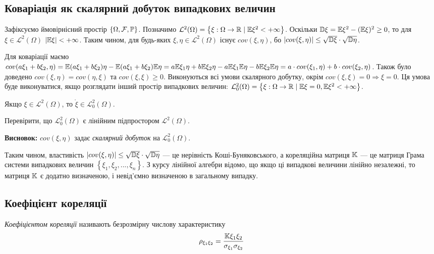 \subsection{Коваріація як скалярний добуток випадкових величин}
Зафіксуємо ймовірнісний простір $\left\{\Omega, \mathcal{F}, \P\right\}$.
Позначимо $\mathcal{L}^2(\Omega) = \left\{\xi : \Omega \rightarrow \mathbb{R} \;|\; \E\xi^2 < +\infty\right\}$.
Оскільки $\D\xi = \E\xi^2 - (\E\xi)^2 \geq 0$, то для $\xi \in \mathcal{L}^2(\Omega)$ $|\E\xi| < +\infty$.
Таким чином, для будь-яких $\xi, \eta \in \mathcal{L}^2(\Omega)$ 
існує ${cov}(\xi,\eta)$, бо $|{cov}(\xi,\eta)| \leq \sqrt{\D\xi} \cdot \sqrt{\D\eta}$.

Для коваріації маємо 
${cov}(a\xi_1 + b\xi_2,\eta) = \E(a\xi_1+b\xi_2)\eta - \E(a\xi_1 + b\xi_2)\E\eta = 
a \E\xi_1\eta + b \E\xi_2\eta - a \E\xi_1 \E\eta - b \E\xi_2 \E\eta = a\cdot{cov}(\xi_1,\eta) + b\cdot{cov}(\xi_2,\eta)$.
Також було доведено ${cov}(\xi, \eta) = {cov}(\eta, \xi)$ та ${cov}(\xi, \xi) \geq 0$.
Виконуються всі умови скалярного добутку, окрім ${cov}(\xi, \xi) = 0 \Rightarrow \xi = 0$.
Ця умова буде виконуватися, якщо розглядати інший простір випадкових величин:
$\mathcal{L}_0^2(\Omega) = \left\{\xi : \Omega \rightarrow \mathbb{R} \;|\; \E\xi = 0, \E\xi^2 < +\infty\right\}$.
\begin{remark}
    Якщо $\xi \in \mathcal{L}^2(\Omega)$, то $\mathring{\xi} \in \mathcal{L}_0^2(\Omega)$.
\end{remark}
\begin{exercise}
    Перевірити, що $\mathcal{L}_0^2(\Omega)$ є лінійним підпростором $\mathcal{L}^2(\Omega)$.
\end{exercise}

\noindent \textbf{Висновок:} ${cov}(\xi, \eta)$ задає \emph{скалярний добуток} на $\mathcal{L}_0^2(\Omega)$.

\vspace{0.5em} 
Таким чином, властивість $|{cov}(\xi,\eta)| \leq \sqrt{\D\xi} \cdot \sqrt{\D\eta}$ ---
це нерівність Коші-Буняковського, а кореляційна матриця $\K$ --- це матриця Грама системи
випадкових величин $\left\{\xi_1, \xi_2, ..., \xi_n\right\}$.
З курсу лінійної алгебри відомо, що якщо ці випадкові величини лінійно незалежні, то матриця $\K$ є додатно визначеною, 
і невід'ємно визначеною в загальному випадку.

\subsection{Коефіцієнт кореляції}
\begin{definition}
    \emph{Коефіцієнтом кореляції} називають безрозмірну числову характеристику
    \begin{equation*}
        \rho_{\xi_1\xi_2} = \frac{\K\xi_1\xi_2}{\sigma_{\xi_1}\sigma_{\xi_2}}
    \end{equation*}
\end{definition}


